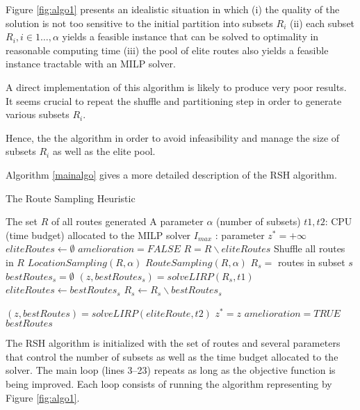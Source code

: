 \documentclass[a4paper,10pt]{article}
\begin{document}
\begin{linenumbers}
Figure \ref{fig:algo1} presents an idealistic situation in which 
(i) the quality of the solution is not too sensitive to the initial partition into subsets $R_i$  
(ii) each subset $R_i, i \in 1\dots, \alpha$ yields a feasible instance that can be solved to optimality in reasonable computing time
(iii) the pool of elite routes also yields a feasible instance tractable with an MILP solver. 


A direct implementation of this algorithm is likely to produce very poor results. 
It seems crucial to repeat the shuffle and partitioning step in order to generate various subsets $R_i$. 
 
Hence, the the algorithm in order to avoid infeasibility and manage the size of subsets $R_i$ as well as the elite pool. 


Algorithm \ref{mainalgo} gives a more detailed description of the RSH algorithm. 

\begin{algorithm}
	\caption{The Route Sampling Heuristic}
	\label{mainalgo}
	\begin{algorithmic}[1]
		\REQUIRE  The set $R$ of all routes generated
		\REQUIRE A parameter $\alpha$ (number of subsets)
		\REQUIRE $t1, t2$: CPU (time budget) allocated to the MILP solver
		\REQUIRE $I_{max}$ : parameter
		\STATE $z^*= +\infty$
		\STATE $eliteRoutes \leftarrow \emptyset$
		\REPEAT
		\STATE $amelioration = FALSE$
		\STATE $R =  R \backslash eliteRoutes$
		\STATE Shuffle all routes in $R$
		\STATE $LocationSampling(R,\alpha)$ 
		\STATE $RouteSampling(R,\alpha)$	
		\STATE $R_s = $ routes in subset $s$
		\STATE $bestRoutes_s = \emptyset$
		\STATE $(z,bestRoutes_s) = solveLIRP(R_s,t1)$ 
		\STATE $eliteRoutes \leftarrow bestRoutes_s$
		\STATE $R_s \leftarrow R_s \backslash bestRoutes_s$
		
		\ENDFOR
		\ENDFOR
		\STATE 	$(z,bestRoutes) = solveLIRP(eliteRoute, t2)$
		\STATE $z^*=z$
		\STATE $amelioration =TRUE$
		\ENDIF
		\RETURN $bestRoutes$
	\end{algorithmic}
\end{algorithm}


The RSH algorithm is initialized with the set of routes and several parameters that control the number of subsets as well as the time budget allocated to the solver. 
The main loop (lines 3--23) repeats as long as the objective function is being improved. 
Each loop consists of running the algorithm representing by Figure  \ref{fig:algo1}. 



\end{linenumbers}
\end{document}
